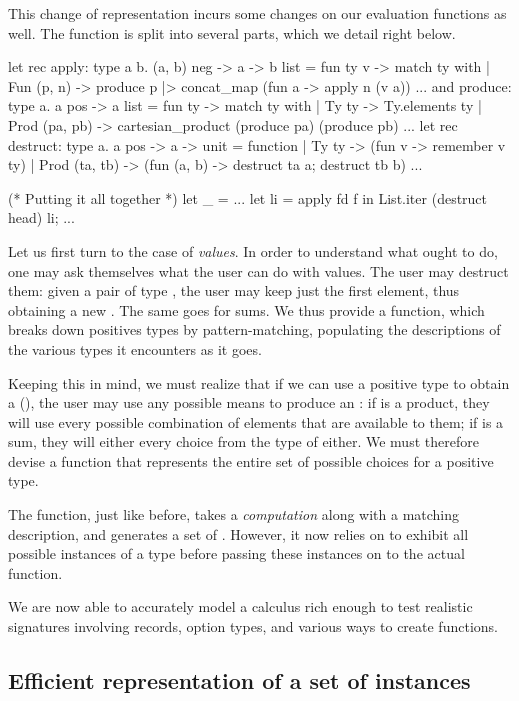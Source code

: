 This change of representation incurs some changes on our evaluation functions
as well. The  function is split into several parts, which we detail
right below.
%
\begin{ocamlcode}
let rec apply: type a b. (a, b) neg -> a -> b list =
  fun ty v -> match ty with
  | Fun (p, n) ->
      produce p |> concat_map (fun a -> apply n (v a))
  ...
and produce: type a. a pos -> a list =
  fun ty -> match ty with
  | Ty ty -> Ty.elements ty
  | Prod (pa, pb) ->
      cartesian_product (produce pa) (produce pb)
  ...
let rec destruct: type a. a pos -> a -> unit =
  function
  | Ty ty -> (fun v ->
      remember v ty)
  | Prod (ta, tb) -> (fun (a, b) ->
      destruct ta a;
      destruct tb b)
  ...

(* Putting it all together *)
let _ =
  ...
  let li = apply fd f in
  List.iter (destruct head) li;
  ...
\end{ocamlcode}
%
Let us first turn to the case of \emph{values}. In order to understand what \arti
ought to do, one may ask themselves what the user can do with values. The user
may destruct them: given a pair of type , the user may keep just
the first element, thus obtaining a new . The same goes for sums. We
thus provide a  function, which breaks down positives types by
pattern-matching, populating the descriptions of the various types it encounters
as it goes.

Keeping this in mind, we must realize that if we can use a positive type
 to obtain a  (), the user may use any possible
means to produce an : if  is a product, they will use every
possible combination of elements that are available to them; if  is a
sum, they will either every choice from the type of either. We must therefore
devise a function  that represents the entire set of possible
choices for a positive type.

The  function, just like before, takes a \emph{computation} along
with a matching description, and generates a set of . However, it now
relies on  to exhibit all possible instances of a type before
passing these instances on to the actual function.

We are now able to accurately model a calculus rich enough to test realistic
signatures involving records, option types, and various ways to create
functions.

\subsection{Efficient representation of a set of instances}
\label{sec:efficient}

